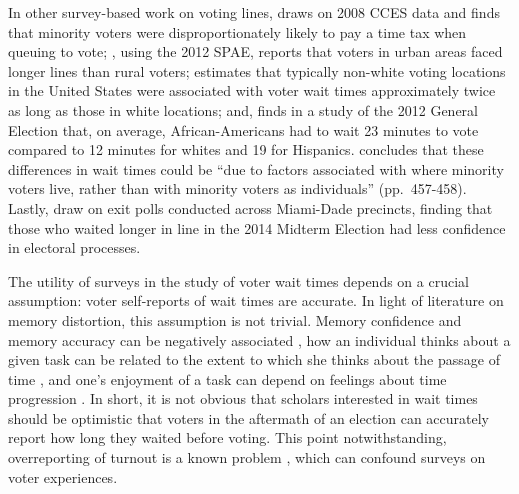 \documentclass[12pt,titlepage]{article}
\begin{document}


In other survey-based work on voting lines, \cite{mukherjee:timetax}
draws on 2008 CCES data and finds that minority voters were
disproportionately likely to pay a time tax when queuing to vote;
\citet{kimball:voting}, using the 2012 SPAE, reports that voters in
urban areas faced longer lines than rural voters;
\citet{pettigrew:racegapwaittimes} estimates that typically non-white
voting locations in the United States were associated with voter wait
times approximately twice as long as those in white locations; and,
\cite{stewart:waitingtovote2012} finds in a study of the 2012 General
Election that, on average, African-Americans had to wait 23 minutes to
vote compared to 12 minutes for whites and 19 for
Hispanics. \citeauthor{stewart:waitingtovote2012} concludes that these
differences in wait times could be ``due to factors associated with
where minority voters live, rather than with minority voters as
individuals'' (pp.\ 457-458). Lastly, \cite{herron:confidence} draw on
exit polls conducted across Miami-Dade precincts, finding that those
who waited longer in line in the 2014 Midterm Election had less
confidence in electoral processes.

The utility of surveys in the study of voter wait times depends on a
crucial assumption: voter self-reports of wait times are accurate.  In
light of literature on memory distortion, this assumption is not
trivial. Memory confidence and memory accuracy can be negatively
associated \citep{hirstetal:sept11memories}, how an individual thinks
about a given task can be related to the extent to which she thinks
about the passage of time \citep{conti:timeflies}, and one's enjoyment
of a task can depend on feelings about time progression
\citep{sackettetal:timeflies}.  In short, it is not obvious that
scholars interested in wait times should be optimistic that voters in
the aftermath of an election can accurately report how long they
waited before voting.  This point notwithstanding, overreporting of
turnout is a known problem \citep{ansolhersh:bigdata}, which can
confound surveys on voter experiences.
\end{document}
